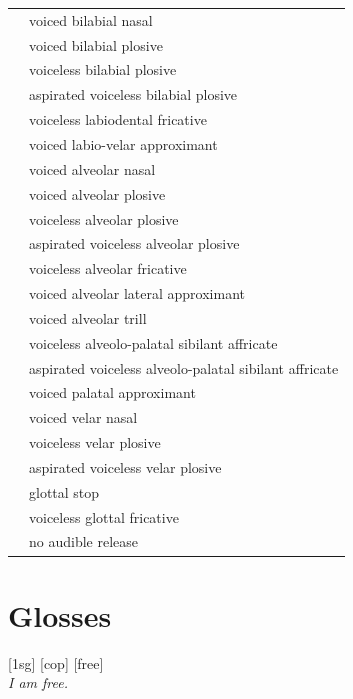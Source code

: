 \documentclass{article}
\begin{document}
\begin{xltabular}{\textwidth}{lL}
   & voiced bilabial nasal \\
   & voiced bilabial plosive \\
   & voiceless bilabial plosive \\
   & aspirated voiceless bilabial plosive \\
   & voiceless labiodental fricative \\
   & voiced labio-velar approximant \\
   & voiced alveolar nasal \\
   & voiced alveolar plosive \\
   & voiceless alveolar plosive \\
   & aspirated voiceless alveolar plosive \\
   & voiceless alveolar fricative \\
   & voiced alveolar lateral approximant \\
   & voiced alveolar trill \\
  \ipa{\texttctclig} & voiceless alveolo-palatal sibilant affricate \\
   & aspirated voiceless alveolo-palatal sibilant affricate\\
   & voiced palatal approximant \\
   & voiced velar nasal \\
   & voiceless velar plosive \\
   & aspirated voiceless velar plosive \\
   & glottal stop \\
   & voiceless glottal fricative \\
  \ipa{\textcorner} & no audible release \\
\end{xltabular}

\newpage\section{Glosses}

\ex[lingstyle=custom_nlevel]
\begingl
{}[{\sc 1sg}]
[{\sc cop}]
[free]
\\\textit{I am free.}
\endgl
\xe
\end{document}
